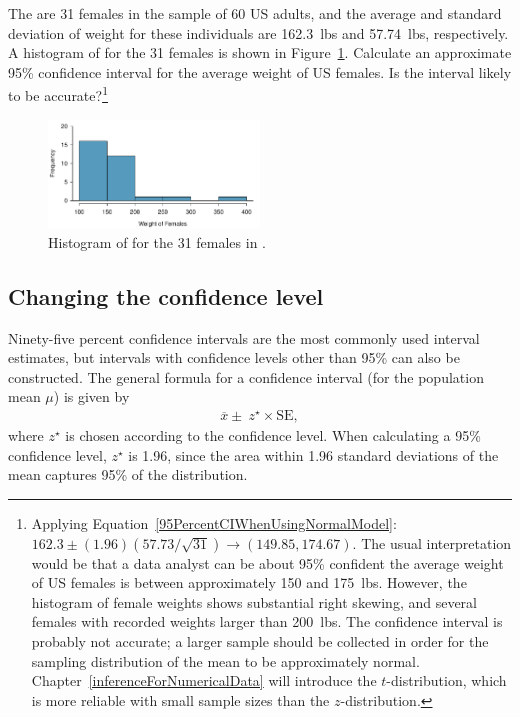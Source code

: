   \begin{exercise} \label{95CIExerciseForWeightUSFemales}
    The are 31 females in the sample of 60 US adults, and the average and standard deviation of weight for these individuals are 162.3~lbs and 57.74~lbs, respectively.  A histogram of  for the 31 females is shown in Figure~\ref{cdcFemaleWeightHist}.  Calculate an approximate 95\% confidence interval for the average weight of US females.  Is the interval likely to be accurate?\footnote{Applying Equation~\ref{95PercentCIWhenUsingNormalModel}: $162.3  \pm (1.96)(57.73/\sqrt{31}) \rightarrow (149.85, 174.67)$.  The usual interpretation would be that a data analyst can be about 95\% confident the average weight of US females is between approximately 150 and 175~lbs.  However, the histogram of female weights shows substantial right skewing, and several females with recorded weights larger than 200~lbs. The confidence interval is probably not accurate; a larger sample should be collected in order for the sampling distribution of the mean to be approximately normal.  Chapter~\ref{inferenceForNumericalData} will introduce the $t$-distribution, which is more reliable with small sample sizes than the $z$-distribution.}
\end{exercise}

\begin{figure}[hht]
   \centering
   \includegraphics[width=0.5\textwidth]
{ch_inference_foundations_oi_biostat/figures/cdcFemaleWeightHistogram/cdcFemaleWeightHistogram.pdf}
\caption{Histogram of  for the 31 females in .}
\label{cdcFemaleWeightHist}
\end{figure}


\subsection{Changing the confidence level}
\label{changingTheConfidenceLevelSection}


Ninety-five percent confidence intervals are the most commonly used interval estimates, but intervals with confidence levels other than 95\% can also be constructed. The general formula for a confidence interval (for the population mean $\mu$) is given by 
\begin{align}
	\overline{x} \pm \ z^{\star} \times \text{SE},
\end{align}
where $z^{\star}$ is chosen according to the confidence level. When calculating a 95\% confidence level, $z^{\star}$ is 1.96, since the area within 1.96 standard deviations of the mean captures 95\% of the distribution.

